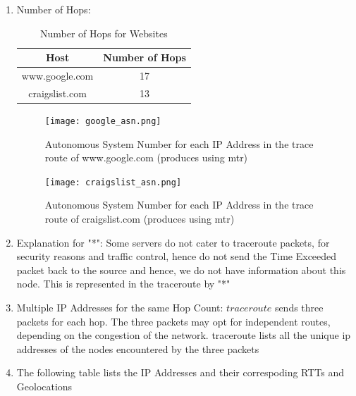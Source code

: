 \documentclass[12pt]{article}
\begin{document}
\begin{enumerate}
    \item Number of Hops:
    \begin{table}[h!]
        \centering
        \caption{Number of Hops for Websites}
        \begin{tabular}{|c|c|}
            \hline
            Host & Number of Hops \\
            \hline
            www.google.com & 17 \\
            craigslist.com & 13 \\
            \hline
        \end{tabular}
    \end{table}
    \begin{figure}[h!]
        \centering
        \texttt{[image: google\_asn.png]}
        \caption{Autonomous System Number for each IP Address in the trace route of www.google.com (produces using mtr)}
    \end{figure}
    \begin{figure}[h!]
        \centering
        \texttt{[image: craigslist\_asn.png]}
        \caption{Autonomous System Number for each IP Address in the trace route of craigslist.com (produces using mtr)}
    \end{figure}
    \item Explanation for "*": Some servers do not cater to traceroute packets, for security reasons and traffic control, hence do not send the Time Exceeded packet back to the source and hence, we do not have information about this node. This is represented in the traceroute by "*"
    \item Multiple IP Addresses for the same Hop Count: $traceroute$ sends three packets for each hop. The three packets may opt for independent routes, depending on the congestion of the network. traceroute lists all the unique ip addresses of the nodes encountered by the three packets
    \item The following table lists the IP Addresses and their correspoding RTTs and Geolocations
    \begin{table}[h!]
        \centering
        \caption{IP Addresses and their GeoLocations for www.google.com}
\end{table}
\end{enumerate}
\end{document}
